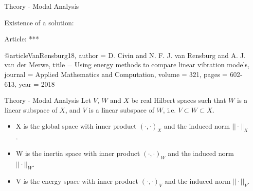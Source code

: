 \documentclass{beamer}
\begin{document}

 \begin{frame}{Theory - Modal Analysis}

    Existence of a solution:

    Article: 
    ***

    @article{VanRensburg18,
  author  = {D. Civin and N. F. J. van Rensburg and A. J. van der Merwe},
  title   = {Using energy methods to compare linear vibration models},
  journal = {Applied Mathematics and Computation},
  volume  = {321},
  pages   = {602-613},
  year    = {2018}
}

\end{frame}

\begin{frame}{Theory - Modal Analysis}
    Let $V$, $W$ and $X$ be real Hilbert spaces such that $W$ is a linear subspace of $X$, and $V$ is a linear subspace of $W$, i.e. $V \subset W \subset X$.
    \begin{itemize}
        \item[] X is the global space with inner product $(\cdot,\cdot)_X$ and the induced norm $||\cdot||_X$.
        \item[] W is the inertia space with inner product $(\cdot,\cdot)_W$ and the induced norm $||\cdot||_W$.
        \item[] V is the energy space with inner product $(\cdot,\cdot)_V$ and the induced norm $||\cdot||_V$.
    \end{itemize}
\end{frame}
\end{document}
